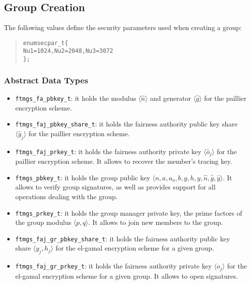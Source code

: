 \documentclass[a4paper]{article}
\newenvironment{code}%
{\begin{quote}\footnotesize\begin{alltt}}%
{\end{alltt}\end{quote}}%
\newcommand{\tuple}[1]{\ensuremath{\langle #1 \rangle}}
\begin{document}
\subsection{Group Creation}
The following values define the security parameters used when creating
a group:
\begin{code}
enum secpar_t \{
    Nu1 = 1024, Nu2 = 2048, Nu3 = 3072
\};
\end{code}
\subsubsection*{Abstract Data Types}
\begin{itemize}\small
\item \verb|ftmgs_fa_pbkey_t|: it holds the modulus \tuple{\hat{n}} and
  generator \tuple{\hat{g}} for the paillier encryption scheme.
\item \verb|ftmgs_faj_pbkey_share_t|: it holds the fairness authority
  public key share \tuple{\hat{y}_j} for the paillier encryption scheme.
\item \verb|ftmgs_faj_prkey_t|: it holds the fairness authority
  private key \tuple{\hat{o}_j} for the paillier encryption scheme. It
  allows to recover the member's tracing key.
\item \verb|ftmgs_pbkey_t|: it holds the group public key
  \tuple{n,a,a_o,b,g,h,y,\hat{n},\hat{g},\hat{y}}. It allows to verify
  group signatures, as well as provides support for all operations
  dealing with the group.
\item \verb|ftmgs_prkey_t|: it holds the group manager private key,
  the prime factors of the group modulus \tuple{p,q}. It allows to
  join new members to the group.
\item \verb|ftmgs_faj_gr_pbkey_share_t|: it holds the fairness
  authority public key share \tuple{y_j,h_j} for the el-gamal encryption
  scheme for a given group.
\item \verb|ftmgs_faj_gr_prkey_t|: it holds the fairness authority
  private key \tuple{o_j} for the el-gamal encryption scheme for a given
  group. It allows to open signatures.
\end{itemize}
\end{document}
